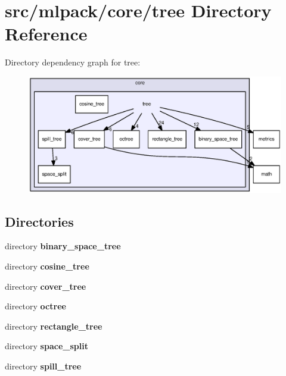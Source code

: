 \section{src/mlpack/core/tree Directory Reference}
\label{dir_d361cbf9654077cd65f7968e3f8eccf6}
Directory dependency graph for tree\+:
\nopagebreak
\begin{figure}[H]
\begin{center}
\leavevmode
\includegraphics[width=350pt]{dir_d361cbf9654077cd65f7968e3f8eccf6_dep}
\end{center}
\end{figure}
\subsection*{Directories}
\begin{DoxyCompactItemize}
\item 
directory {\bf binary\+\_\+space\+\_\+tree}
\item 
directory {\bf cosine\+\_\+tree}
\item 
directory {\bf cover\+\_\+tree}
\item 
directory {\bf octree}
\item 
directory {\bf rectangle\+\_\+tree}
\item 
directory {\bf space\+\_\+split}
\item 
directory {\bf spill\+\_\+tree}
\end{DoxyCompactItemize}
